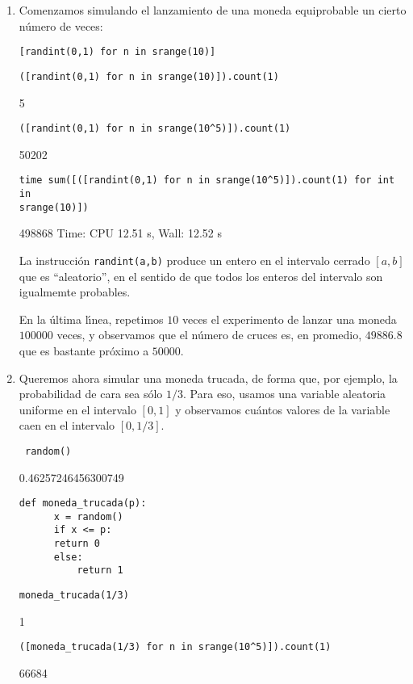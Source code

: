 \begin{enumerate}
 \item Comenzamos simulando el lanzamiento de una moneda equiprobable un cierto
n\'umero de veces:
 \begin{lstlisting}
[randint(0,1) for n in srange(10)]
\end{lstlisting}
\begin{Output}
[0, 1, 0, 0, 1, 0, 0, 1, 1, 1]
\end{Output}
\begin{lstlisting}
([randint(0,1) for n in srange(10)]).count(1)
\end{lstlisting}
\begin{Output}
5
\end{Output}
\begin{lstlisting}
([randint(0,1) for n in srange(10^5)]).count(1)
\end{lstlisting}
\begin{Output}
50202
\end{Output}
\begin{lstlisting}
time sum([([randint(0,1) for n in srange(10^5)]).count(1) for int in
srange(10)])
\end{lstlisting}
\begin{Output}
498868
Time: CPU 12.51 s, Wall: 12.52 s
\end{Output}

La instrucci\'on {\tt randint(a,b)} produce un entero en el intervalo cerrado
$[a,b]$ que es ``aleatorio'',  en el sentido de que todos los enteros del
intervalo son igualmemte probables. 

En la \'ultima l\'{\i}nea, repetimos $10$ veces el experimento de lanzar una
moneda $100000$ veces, y observamos que el n\'umero de cruces es, en promedio,
$49886{.}8$ que es bastante pr\'oximo a $50000.$
 \item Queremos ahora simular una {\sc moneda trucada}, de forma que, por
ejemplo, la probabilidad de cara sea s\'olo $1/3$. Para eso, usamos una {\sc
variable aleatoria uniforme} en el intervalo $[0,1]$ y observamos cu\'antos
valores de la variable caen en el intervalo $[0,1/3].$
 \begin{lstlisting}
 random()
 \end{lstlisting}
 \begin{Output}
0.46257246456300749
\end{Output}
\begin{lstlisting}
def moneda_trucada(p):
      x = random()
      if x <= p:
	  return 0
      else:
          return 1
\end{lstlisting}
\begin{lstlisting}
moneda_trucada(1/3)
\end{lstlisting}
\begin{Output}
1
\end{Output}
\begin{lstlisting}
([moneda_trucada(1/3) for n in srange(10^5)]).count(1)
\end{lstlisting}
\begin{Output}
66684 
\end{Output}


\end{enumerate}
